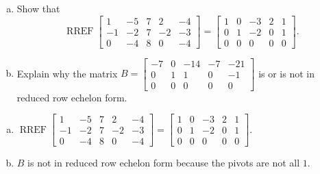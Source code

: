 
\begin{exerciseStatement}

\begin{enumerate}[(a)]
\item Show that \[\operatorname{RREF} \left[\begin{array}{ccccc}
1 & -5 & 7 & 2 & -4 \\
-1 & -2 & 7 & -2 & -3 \\
0 & -4 & 8 & 0 & -4
\end{array}\right] = \left[\begin{array}{ccccc}
1 & 0 & -3 & 2 & 1 \\
0 & 1 & -2 & 0 & 1 \\
0 & 0 & 0 & 0 & 0
\end{array}\right] .\]
\item Explain why the matrix \(B= \left[\begin{array}{ccccc}
-7 & 0 & -14 & -7 & -21 \\
0 & 1 & 1 & 0 & -1 \\
0 & 0 & 0 & 0 & 0
\end{array}\right] \) is or is not in reduced row echelon form.
\end{enumerate}
    
\end{exerciseStatement}
    
\begin{exerciseAnswer} 

\begin{enumerate}[(a)]
\item \(\operatorname{RREF} \left[\begin{array}{ccccc}
1 & -5 & 7 & 2 & -4 \\
-1 & -2 & 7 & -2 & -3 \\
0 & -4 & 8 & 0 & -4
\end{array}\right] = \left[\begin{array}{ccccc}
1 & 0 & -3 & 2 & 1 \\
0 & 1 & -2 & 0 & 1 \\
0 & 0 & 0 & 0 & 0
\end{array}\right] .\)
\item \(B\) is not in reduced row echelon form because the pivots are not all \(1\). 
\end{enumerate}
    
\end{exerciseAnswer}
    
